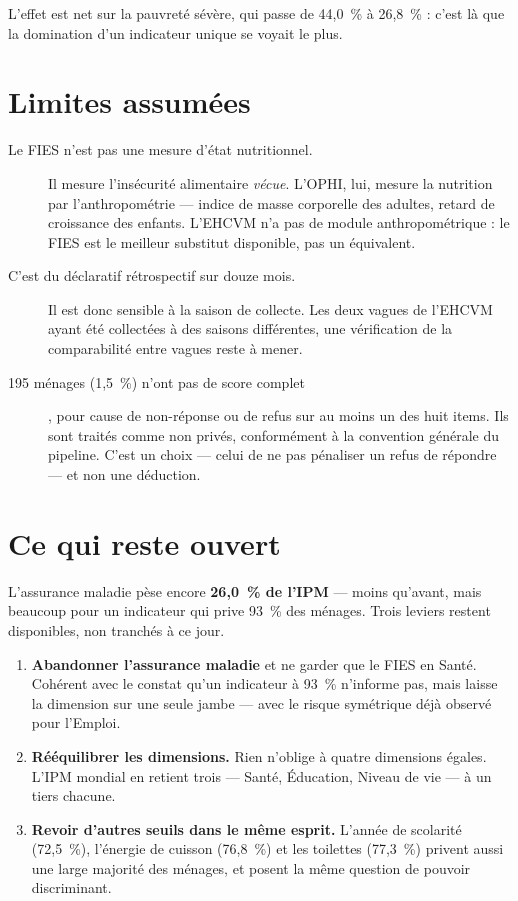 \documentclass[11pt,a4paper]{article}
\begin{document}
L'effet est net sur la pauvreté sévère, qui passe de 44,0~\% à 26,8~\% : c'est là que la
domination d'un indicateur unique se voyait le plus.

\section{Limites assumées}

\begin{description}
  \item[Le FIES n'est pas une mesure d'état nutritionnel.] Il mesure l'insécurité alimentaire
  \emph{vécue}. L'OPHI, lui, mesure la nutrition par l'anthropométrie --- indice de masse
  corporelle des adultes, retard de croissance des enfants. L'EHCVM n'a pas de module
  anthropométrique : le FIES est le meilleur substitut disponible, pas un équivalent.

  \item[C'est du déclaratif rétrospectif sur douze mois.] Il est donc sensible à la saison de
  collecte. Les deux vagues de l'EHCVM ayant été collectées à des saisons différentes, une
  vérification de la comparabilité entre vagues reste à mener.

  \item[195 ménages (1,5~\%) n'ont pas de score complet], pour cause de non-réponse ou de refus
  sur au moins un des huit items. Ils sont traités comme non privés, conformément à la convention
  générale du pipeline. C'est un choix --- celui de ne pas pénaliser un refus de répondre --- et
  non une déduction.
\end{description}

\section{Ce qui reste ouvert}

\begin{attention}[$H = 65{,}8~\%$ demeure au-dessus de l'ordre de grandeur de référence]
L'assurance maladie pèse encore \textbf{26,0~\% de l'IPM} --- moins qu'avant, mais beaucoup pour
un indicateur qui prive 93~\% des ménages. Trois leviers restent disponibles, non tranchés à ce
jour.
\end{attention}

\begin{enumerate}
  \item \textbf{Abandonner l'assurance maladie} et ne garder que le FIES en Santé. Cohérent avec
  le constat qu'un indicateur à 93~\% n'informe pas, mais laisse la dimension sur une seule jambe
  --- avec le risque symétrique déjà observé pour l'Emploi.

  \item \textbf{Rééquilibrer les dimensions.} Rien n'oblige à quatre dimensions égales. L'IPM
  mondial en retient trois --- Santé, Éducation, Niveau de vie --- à un tiers chacune.

  \item \textbf{Revoir d'autres seuils dans le même esprit.} L'année de scolarité (72,5~\%),
  l'énergie de cuisson (76,8~\%) et les toilettes (77,3~\%) privent aussi une large majorité des
  ménages, et posent la même question de pouvoir discriminant.
\end{enumerate}
\end{document}
